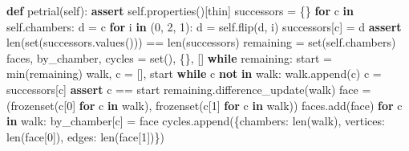 \documentclass[
  10pt,
  letterpaper,
]{article}
\newenvironment{Shaded}{}{}
\newcommand{\BuiltInTok}[1]{\textcolor[rgb]{0.00,0.50,0.00}{#1}}
\newcommand{\ControlFlowTok}[1]{\textcolor[rgb]{0.00,0.44,0.13}{\textbf{#1}}}
\newcommand{\DecValTok}[1]{\textcolor[rgb]{0.25,0.63,0.44}{#1}}
\newcommand{\KeywordTok}[1]{\textcolor[rgb]{0.00,0.44,0.13}{\textbf{#1}}}
\newcommand{\NormalTok}[1]{#1}
\newcommand{\OperatorTok}[1]{\textcolor[rgb]{0.40,0.40,0.40}{#1}}
\newcommand{\StringTok}[1]{\textcolor[rgb]{0.25,0.44,0.63}{#1}}
\newcommand{\VariableTok}[1]{\textcolor[rgb]{0.10,0.09,0.49}{#1}}
\begin{document}
\begin{Shaded}
\begin{Highlighting}[]
    \KeywordTok{def}\NormalTok{ petrial(}\VariableTok{self}\NormalTok{):}
        \ControlFlowTok{assert} \VariableTok{self}\NormalTok{.properties()[}\StringTok{\textquotesingle{}thin\textquotesingle{}}\NormalTok{]}
\NormalTok{        successors }\OperatorTok{=}\NormalTok{ \{\}}
        \ControlFlowTok{for}\NormalTok{ c }\KeywordTok{in} \VariableTok{self}\NormalTok{.chambers:}
\NormalTok{            d }\OperatorTok{=}\NormalTok{ c}
            \ControlFlowTok{for}\NormalTok{ i }\KeywordTok{in}\NormalTok{ (}\DecValTok{0}\NormalTok{, }\DecValTok{2}\NormalTok{, }\DecValTok{1}\NormalTok{):}
\NormalTok{                d }\OperatorTok{=} \VariableTok{self}\NormalTok{.flip(d, i)}
\NormalTok{            successors[c] }\OperatorTok{=}\NormalTok{ d}
        \ControlFlowTok{assert} \BuiltInTok{len}\NormalTok{(}\BuiltInTok{set}\NormalTok{(successors.values())) }\OperatorTok{==} \BuiltInTok{len}\NormalTok{(successors)}
\NormalTok{        remaining }\OperatorTok{=} \BuiltInTok{set}\NormalTok{(}\VariableTok{self}\NormalTok{.chambers)}
\NormalTok{        faces, by\_chamber, cycles }\OperatorTok{=} \BuiltInTok{set}\NormalTok{(), \{\}, []}
        \ControlFlowTok{while}\NormalTok{ remaining:}
\NormalTok{            start }\OperatorTok{=} \BuiltInTok{min}\NormalTok{(remaining)}
\NormalTok{            walk, c }\OperatorTok{=}\NormalTok{ [], start}
            \ControlFlowTok{while}\NormalTok{ c }\KeywordTok{not} \KeywordTok{in}\NormalTok{ walk:}
\NormalTok{                walk.append(c)}
\NormalTok{                c }\OperatorTok{=}\NormalTok{ successors[c]}
            \ControlFlowTok{assert}\NormalTok{ c }\OperatorTok{==}\NormalTok{ start}
\NormalTok{            remaining.difference\_update(walk)}
\NormalTok{            face }\OperatorTok{=}\NormalTok{ (}\BuiltInTok{frozenset}\NormalTok{(c[}\DecValTok{0}\NormalTok{] }\ControlFlowTok{for}\NormalTok{ c }\KeywordTok{in}\NormalTok{ walk), }\BuiltInTok{frozenset}\NormalTok{(c[}\DecValTok{1}\NormalTok{] }\ControlFlowTok{for}\NormalTok{ c }\KeywordTok{in}\NormalTok{ walk))}
\NormalTok{            faces.add(face)}
            \ControlFlowTok{for}\NormalTok{ c }\KeywordTok{in}\NormalTok{ walk:}
\NormalTok{                by\_chamber[c] }\OperatorTok{=}\NormalTok{ face}
\NormalTok{            cycles.append(\{}\StringTok{\textquotesingle{}chambers\textquotesingle{}}\NormalTok{: }\BuiltInTok{len}\NormalTok{(walk), }\StringTok{\textquotesingle{}vertices\textquotesingle{}}\NormalTok{: }\BuiltInTok{len}\NormalTok{(face[}\DecValTok{0}\NormalTok{]),}
                           \StringTok{\textquotesingle{}edges\textquotesingle{}}\NormalTok{: }\BuiltInTok{len}\NormalTok{(face[}\DecValTok{1}\NormalTok{])\})}

\end{Highlighting}
\end{Shaded}
\end{document}
